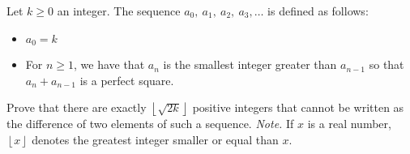 Let $k\geq 0$ an integer. The sequence $a_0,\ a_1,\ a_2, \ a_3, \ldots$ is defined as follows:
\begin{itemize}
	\item $a_0=k$
	\item For $n\geq 1$, we have that $a_n$ is the smallest integer greater than $a_{n-1}$ so that $a_n+a_{n-1}$ is a perfect square.
\end{itemize}
Prove that there are exactly $\left \lfloor{\sqrt{2k}} \right \rfloor$ positive integers that cannot be written as the difference of two elements of such a sequence.
\textit{Note.} If $x$ is a real number, $\left \lfloor{x} \right \rfloor$ denotes the greatest integer smaller or equal than $x$.